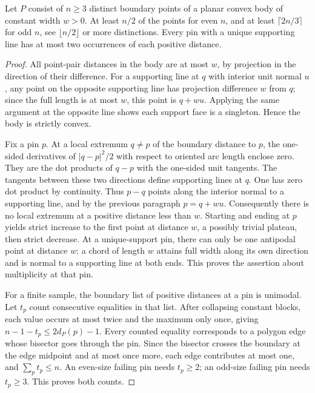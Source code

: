 \begin{theorem}[982-S03, 982-S04]
Let \(P\) consist of \(n\ge3\) distinct boundary points of a planar convex body of constant width \(w>0\). At least \(n/2\) of the points for even \(n\), and at least \(\lceil2n/3\rceil\) for odd \(n\), see \(\lfloor n/2\rfloor\) or more distinctions. Every pin with a unique supporting line has at most two occurrences of each positive distance.
\end{theorem}

\begin{proof}
All point-pair distances in the body are at most \(w\), by projection in the direction of their difference. For a supporting line at \(q\) with interior unit normal \(u\), any point on the opposite supporting line has projection difference \(w\) from \(q\); since the full length is at most \(w\), this point is \(q+wu\). Applying the same argument at the opposite line shows each support face is a singleton. Hence the body is strictly convex.

Fix a pin \(p\). At a local extremum \(q\ne p\) of the boundary distance to \(p\), the one-sided derivatives of \(|q-p|^2/2\) with respect to oriented arc length enclose zero. They are the dot products of \(q-p\) with the one-sided unit tangents. The tangents between these two directions define supporting lines at \(q\). One has zero dot product by continuity. Thus \(p-q\) points along the interior normal to a supporting line, and by the previous paragraph \(p=q+wu\). Consequently there is no local extremum at a positive distance less than \(w\). Starting and ending at \(p\) yields strict increase to the first point at distance \(w\), a possibly trivial plateau, then strict decrease. At a unique-support pin, there can only be one antipodal point at distance \(w\): a chord of length \(w\) attains full width along its own direction and is normal to a supporting line at both ends. This proves the assertion about multiplicity at that pin.

For a finite sample, the boundary list of positive distances at a pin is unimodal. Let \(t_p\) count consecutive equalities in that list. After collapsing constant blocks, each value occurs at most twice and the maximum only once, giving \(n-1-t_p\le2d_P(p)-1\). Every counted equality corresponds to a polygon edge whose bisector goes through the pin. Since the bisector crosses the boundary at the edge midpoint and at most once more, each edge contributes at most one, and \(\sum_p t_p\le n\). An even-size failing pin needs \(t_p\ge2\); an odd-size failing pin needs \(t_p\ge3\). This proves both counts.
\end{proof}

